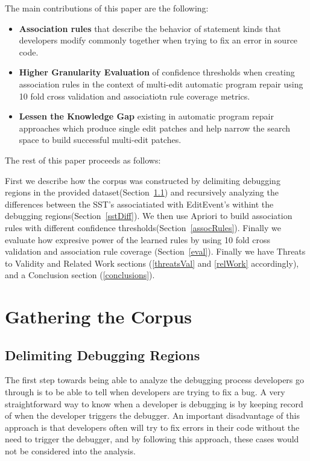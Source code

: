 \documentclass[sigconf]{acmart}
\begin{document}
The main contributions of this paper are the following:
\begin{itemize}
\item \textbf{Association rules} that describe the behavior
of statement kinds that developers modify commonly together when
trying to fix an error in source code.  

\item \textbf{Higher Granularity Evaluation} 
of confidence thresholds when creating
association rules in the context of multi-edit automatic
program repair using 10 fold cross validation and associatiotn
rule coverage metrics.

\item \textbf{Lessen the Knowledge Gap} existing in automatic
program repair approaches which produce single edit patches and
help narrow the search space to build successful multi-edit 
patches.

\end{itemize}

The rest of this paper proceeds as follows:

First we describe how the corpus was constructed by 
delimiting debugging regions in the provided dataset(Section~\ref{delimitDebugRegions}) and recursively analyzing the
differences between the SST's associatiated with EditEvent's
withint the debugging regions(Section~\ref{sstDiff}). 
We then use Apriori to build association rules with different
confidence thresholds(Section~\ref{assocRules}). Finally
we evaluate how expresive power of the learned rules by
using 10 fold cross validation and association rule coverage
(Section~\ref{eval}). Finally we have Threats to Validity and 
Related Work sections (\ref{threatsVal} and \ref{relWork} 
accordingly), and a Conclusion section (\ref{conclusions}).

\section{Gathering the Corpus}
\subsection{Delimiting Debugging Regions}
\label{delimitDebugRegions}
The first step towards being able to analyze the debugging
process developers go through is to be able to tell when
developers are trying to fix a bug. A very straightforward 
way to know when a developer is debugging is by keeping
record of when the developer triggers the debugger. An important
disadvantage of this approach is that 
developers often will try to fix errors in their code without the
need to trigger the debugger, and by following this approach,
these cases would not
be considered into the analysis.
\end{document}
